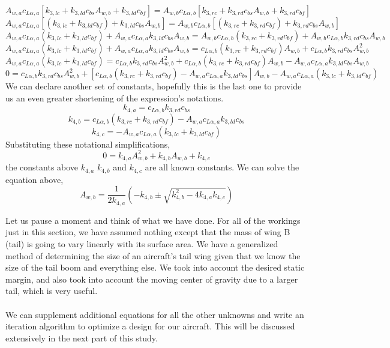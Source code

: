 $$A_{w,a} c_{L\alpha,a} \left[k_{3,lc} + k_{3,ld}c_{bs}A_{w,b} + k_{3,ld}c_{bf} \right] = A_{w,b} c_{L\alpha,b}\left[k_{3,rc} + k_{3,rd}c_{bs}A_{w,b} + k_{3,rd}c_{bf}\right] $$
$$A_{w,a} c_{L\alpha,a} \left[(k_{3,lc} + k_{3,ld}c_{bf}) + k_{3,ld}c_{bs}A_{w,b} \right] = A_{w,b} c_{L\alpha,b}\left[(k_{3,rc} + k_{3,rd}c_{bf}) + k_{3,rd}c_{bs}A_{w,b}\right] $$
$$A_{w,a} c_{L\alpha,a}(k_{3,lc} + k_{3,ld}c_{bf}) + A_{w,a} c_{L\alpha,a}k_{3,ld}c_{bs}A_{w,b}   =  A_{w,b} c_{L\alpha,b}(k_{3,rc} + k_{3,rd}c_{bf}) + A_{w,b} c_{L\alpha,b}k_{3,rd}c_{bs}A_{w,b}  $$
$$A_{w,a}c_{L\alpha,a}(k_{3,lc}+k_{3,ld}c_{bf}) + A_{w,a}c_{L\alpha,a}k_{3,ld}c_{bs}A_{w,b} = c_{L\alpha,b}(k_{3,rc}+k_{3,rd}c_{bf})A_{w,b} + c_{L\alpha,b}k_{3,rd}c_{bs}A_{w,b}^{2}$$
$$A_{w,a}c_{L\alpha,a}(k_{3,lc}+k_{3,ld}c_{bf}) = c_{L\alpha,b}k_{3,rd}c_{bs}A_{w,b}^{2} + c_{L\alpha,b}(k_{3,rc}+k_{3,rd}c_{bf})A_{w,b} - A_{w,a}c_{L\alpha,a}k_{3,ld}c_{bs}A_{w,b}$$
$$0 = c_{L\alpha,b}k_{3,rd}c_{bs}A_{w,b}^{2} + [c_{L\alpha,b}(k_{3,rc}+k_{3,rd}c_{bf})-A_{w,a}c_{L\alpha,a}k_{3,ld}c_{bs}]A_{w,b} - A_{w,a}c_{L\alpha,a}(k_{3,lc}+k_{3,ld}c_{bf})$$
We can declare another set of constants, hopefully this is the last one to provide us an even greater shortening of the expression's notations.
\begin{equation}k_{4,a} = c_{L\alpha,b}k_{3,rd}c_{bs} \label{k4 definitions coeff a}\end{equation}
\begin{equation}k_{4,b} = c_{L\alpha,b}(k_{3,rc}+k_{3,rd}c_{bf})-A_{w,a}c_{L\alpha,a}k_{3,ld}c_{bs} \label{k4 definitions coeff b}\end{equation}
\begin{equation}k_{4,c} =  - A_{w,a}c_{L\alpha,a}(k_{3,lc}+k_{3,ld}c_{bf}) \label{k4 definitions coeff c}\end{equation}
Substituting these notational simplifications,
$$0 = k_{4,a}A_{w,b}^{2} + k_{4,b}A_{w,b} + k_{4,c}$$
the constants above $k_{4,a}$ $k_{4,b}$ and $k_{4,c}$ are all known constants. We can solve the equation above,
$$A_{w,b} = \frac{1}{2k_{4,a}}\left(-k_{4,b} \pm \sqrt{k_{4,b}^{2}-4k_{4,a}k_{4,c}}\right)$$

Let us pause a moment and think of what we have done. For all of the workings just in this section, we have assumed nothing except that the mass of wing B (tail) is going to vary linearly with its surface area. We have a generalized method of determining the size of an aircraft's tail wing given that we know the size of the tail boom and everything else. We took into account the desired static margin, and also took into account the moving center of gravity due to a larger tail, which is very useful.
\\~\\We can supplement additional equations for all the other unknowns and write an iteration algorithm to optimize a design for our aircraft. This will be discussed extensively in the next part of this study.

